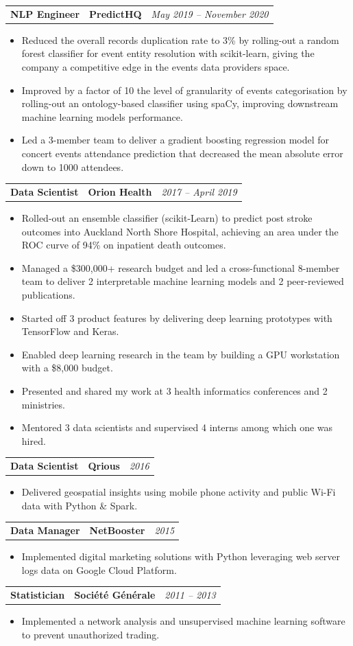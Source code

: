 \documentclass[letterpaper,11pt]{article}
\newcommand{\resumeItemListStart}{\begin{itemize}[label=$\circ$, topsep=0.1cm, parsep=0cm, partopsep=0cm, itemsep=0.1cm, leftmargin=0.4cm]}
\newcommand{\resumeItem}[1]{\item\small{#1}}
\newcommand{\resumeItemListEnd}{\end{itemize}}
\newcommand{\job}[4]{
    \begin{tabular}{p{7cm}p{6cm}p{5cm}}
      \hspace{-0.7em} \textbf{#1} & \textbf{\small{#2}} & \hfill \textit{\small{#4}}
    \end{tabular}
}
\begin{document}
\job {NLP Engineer}{PredictHQ}{Auckland}{May 2019 -- November 2020}
\resumeItemListStart
\resumeItem {Reduced the overall records duplication rate to 3\% by rolling-out a random forest classifier for event entity resolution with scikit-learn, giving the company a competitive edge in the events data providers space.}
\resumeItem {Improved by a factor of 10 the level of granularity of events categorisation by rolling-out an ontology-based classifier using spaCy, improving downstream machine learning models performance.}
\resumeItem {Led a 3-member team to deliver a gradient boosting regression model for concert events attendance prediction that decreased the mean absolute error down to 1000 attendees.}
\resumeItemListEnd \vspace{0.2cm}
	
\job {Data Scientist}{Orion Health}{Auckland}{2017 -- April 2019}
\resumeItemListStart
\resumeItem {Rolled-out an ensemble classifier (scikit-Learn) to predict post stroke outcomes into Auckland North Shore Hospital, achieving an area under the ROC curve of 94\% on inpatient death outcomes.}
\resumeItem {Managed a \$300,000+ research budget and led a cross-functional 8-member team to deliver 2 interpretable machine learning models and 2 peer-reviewed publications.}
\resumeItem {Started off 3 product features by delivering deep learning prototypes with TensorFlow and Keras.}
\resumeItem {Enabled deep learning research in the team by building a GPU workstation with a \$8,000 budget.}
\resumeItem {Presented and shared my work at 3 health informatics conferences and 2 ministries.}
\resumeItem {Mentored 3 data scientists and supervised 4 interns among which one was hired.}
\resumeItemListEnd \vspace{0.2cm}

\job {Data Scientist}{Qrious}{Auckland}{2016}
\resumeItemListStart
\resumeItem {Delivered geospatial insights using mobile phone activity and public Wi-Fi data with Python \& Spark.}
\resumeItemListEnd \vspace{0.2cm}

\job {Data Manager}{NetBooster}{Paris}{2015}
\resumeItemListStart
\resumeItem {Implemented digital marketing solutions with Python leveraging web server logs data on Google Cloud Platform.}
\resumeItemListEnd \vspace{0.2cm}

\job {Statistician}{Société Générale}{Paris}{2011 -- 2013}
\resumeItemListStart
\resumeItem {Implemented a network analysis and unsupervised machine learning software to prevent unauthorized trading.}
\resumeItemListEnd 
\end{document}
